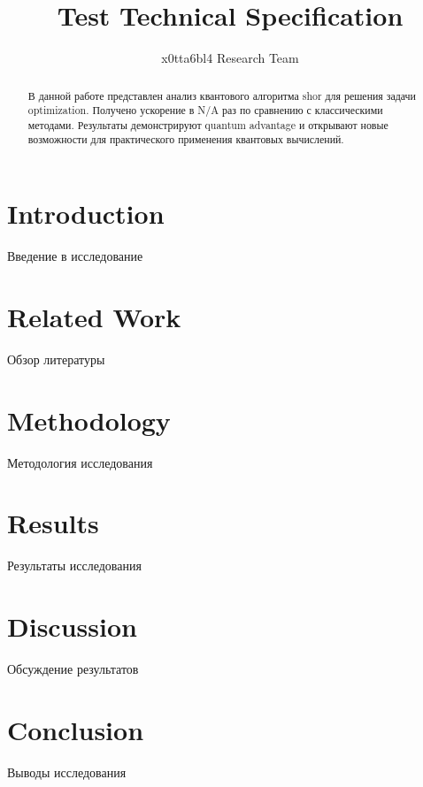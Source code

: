 \title{Test Technical Specification}
\author{x0tta6bl4 Research Team}



\maketitle

\begin{abstract}
В данной работе представлен анализ квантового алгоритма shor
для решения задачи optimization. Получено ускорение в N/A раз
по сравнению с классическими методами. Результаты демонстрируют quantum advantage
и открывают новые возможности для практического применения квантовых вычислений.
\end{abstract}

\section{Introduction}
Введение в исследование

\section{Related Work}
Обзор литературы

\section{Methodology}
Методология исследования

\section{Results}
Результаты исследования

\section{Discussion}
Обсуждение результатов

\section{Conclusion}
Выводы исследования




